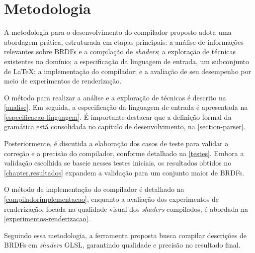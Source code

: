 \chapter{Metodologia} \label{metodologia}

A metodologia para o desenvolvimento do compilador proposto adota uma abordagem prática, estruturada em etapas principais: a análise de informações relevantes sobre BRDFs e a compilação de \textit{shaders}; a exploração de técnicas existentes no domínio; a especificação da linguagem de entrada, um subconjunto de \LaTeX{}; a implementação do compilador; e a avaliação de seu desempenho por meio de experimentos de renderização.

O método para realizar a análise e a exploração de técnicas é descrito na \autoref{analise}. Em seguida, a especificação da linguagem de entrada é apresentada na \autoref{especificacao-linguagem}. É importante destacar que a definição formal da gramática está consolidada no capítulo de desenvolvimento, na \autoref{section-parser}.

Posteriormente, é discutida a elaboração dos casos de teste para validar a correção e a precisão do compilador, conforme detalhado na \autoref{testes}. Embora a validação escolhida se baseie nesses testes iniciais, os resultados obtidos no \autoref{chapter.resultados} expandem a validação para um conjunto maior de BRDFs.

O método de implementação do compilador é detalhado na \autoref{compiladorimplementacao}, enquanto a avaliação dos experimentos de renderização, focada na qualidade visual dos \textit{shaders} compilados, é abordada na \autoref{experimentos-renderizacao}.


Seguindo essa metodologia, a ferramenta proposta busca compilar descrições de BRDFs em \textit{shaders} GLSL, garantindo qualidade e precisão no resultado final.




